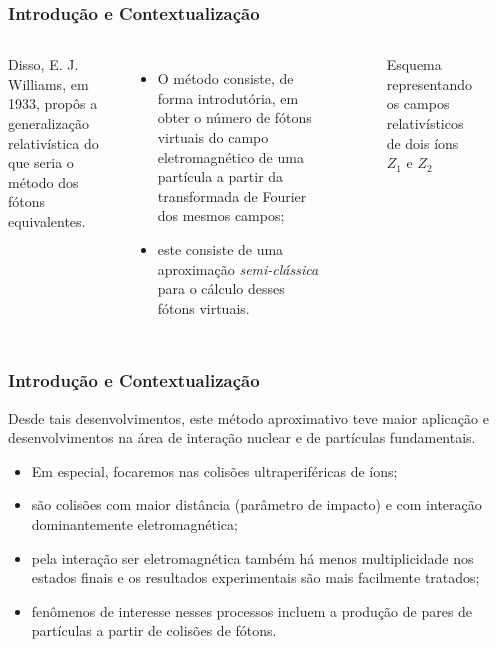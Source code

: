 \documentclass[xcolor=dvipsnames]{beamer}
\begin{document}
\begin{frame}
	\frametitle{Introdução e Contextualização}
	\begin{columns}
		Disso, E. J. Williams, em 1933, propôs a generalização relativística do que
		seria o método dos fótons equivalentes.
		\begin{itemize}
			\item O método consiste, de forma introdutória, em obter o número de 
				fótons virtuais do campo eletromagnético de uma partícula a
				partir da transformada de Fourier dos mesmos campos;
			\item este consiste de uma aproximação \textit{semi-clássica} para
				o cálculo desses fótons virtuais.
		\end{itemize}

		\begin{figure}
			
			\caption{Esquema representando os campos relativísticos de dois íons
			$Z_1$ e $Z_2$}
		\end{figure}
	\end{columns}
\end{frame}

\begin{frame}
	\frametitle{Introdução e Contextualização}
	Desde tais desenvolvimentos, este método aproximativo teve maior aplicação e
	desenvolvimentos na área de interação nuclear e de partículas fundamentais.
	\begin{itemize}
		\item Em especial, focaremos nas colisões ultraperiféricas de íons;
		\item são colisões com maior distância (parâmetro de impacto) e com
			interação dominantemente eletromagnética;
		\item pela interação ser eletromagnética também há menos multiplicidade
			nos estados finais e os resultados experimentais são mais facilmente
			tratados;
		\item fenômenos de interesse nesses processos incluem a produção de
			pares de partículas a partir de colisões de fótons.
	\end{itemize}
\end{frame}
\end{document}
